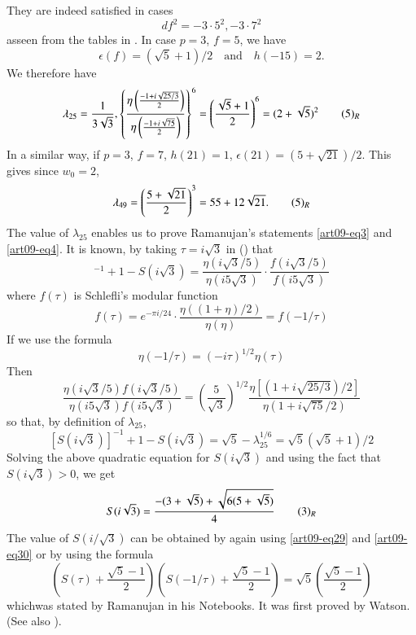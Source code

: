 They are indeed satisfied in cases
$$
df^{2}=-3\cdot 5^{2}, - 3\cdot 7^{2}
$$
as\pageoriginale seen from the tables in \cite{art09-key1}. In case $p=3$, $f=5$, we have
$$
\epsilon(f)=(\sqrt{5}+1)/2\text{~~ and~~ } h(-15)=2.
$$
We therefore have
\begin{equation*}
\lambda_{25} =\frac{1}{3\sqrt{3}},\left\{\frac{\eta\left(\frac{-1+i\sqrt{25/3}}{2}\right)}{\eta\left(\frac{-1+i\sqrt{75}}{2}\right)}\right\}^{6}=\left(\frac{\sqrt{5}+1}{2}\right)^{6}=(2+\sqrt{5})^{2}\tag*{(5)$_{R}$}\label{art09-eq5R}
\end{equation*}
In a similar way, if $p=3$, $f=7$, $h(21)=1$, $\epsilon(21)=(5+\sqrt{21})/2$. This gives since $w_{0}=2$,
\begin{equation*}
\lambda_{49}=\left(\frac{5+\sqrt{21}}{2}\right)^{3}=55+12\sqrt{21}.\tag*{(5)$_{R}$}\label{art09-addeq5R}
\end{equation*}
The value of $\lambda_{25}$ enables us to prove Ramanujan's statements \eqref{art09-eq3} and \eqref{art09-eq4}. It is known, by taking $\tau=i\sqrt{3}$ in (\cite[p. 700]{art09-key4}) that
\begin{equation}
[S(i\sqrt{3})]^{-1}+1-S(i\sqrt{3})=\frac{\eta(i\sqrt{3}/5)}{\eta(i5\sqrt{3})}\cdot \frac{f(i\sqrt{3}/5)}{f(i5\sqrt{3})}\label{art09-eq28}
\end{equation}
where $f(\tau)$ is Schlefli's modular function
\begin{equation}
f(\tau)=e^{-\pi i/24}\cdot \dfrac{\eta((1+\eta)/2)}{\eta(\eta)}=f(-1/\tau)\label{art09-eq29}
\end{equation}
If we use the formula
\begin{equation}
\eta(-1/\tau)=(-i\tau)^{1/2}\eta(\tau)\label{art09-eq30}
\end{equation}
Then
$$
\frac{\eta(i\sqrt{3}/5)f(i\sqrt{3}/5)}{\eta(i5\sqrt{3})f(i5\sqrt{3})}=\left(\dfrac{5}{\sqrt{3}}\right)^{1/2}\frac{\eta[(1+i\sqrt{25/3})/2]}{\eta(1+i\sqrt{75}/2)}
$$
so that, by definition of $\lambda_{25}$,
$$
[S(i\sqrt{3})]^{-1}+1-S(i\sqrt{3})=\sqrt{5}-\lambda^{1/6}_{25}=\sqrt{5}(\sqrt{5}+1)/2
$$
Solving the above quadratic equation for $S(i\sqrt{3})$ and using the fact that $S(i\sqrt{3})>0$, we get
\begin{equation*}
S(i\sqrt{3})=\frac{-(3+\sqrt{5})+\sqrt{6(5+\sqrt{5})}}{4}\tag*{(3)$_{R}$}\label{art09-addeq3R}
\end{equation*}
The value of $S(i/\sqrt{3})$ can be obtained by again using \eqref{art09-eq29} and \eqref{art09-eq30} or by using the formula
\begin{equation}
\left(S(\tau)+\frac{\sqrt{5}-1}{2}\right)\left(S(-1/\tau)+\frac{\sqrt{5}-1}{2}\right)=\sqrt{5}\left(\frac{\sqrt{5}-1}{2}\right)\label{art09-eq31}
\end{equation}
which\pageoriginale was stated by Ramanujan in his Notebooks. It was first proved by Watson. (See also \cite{art09-key4}).

